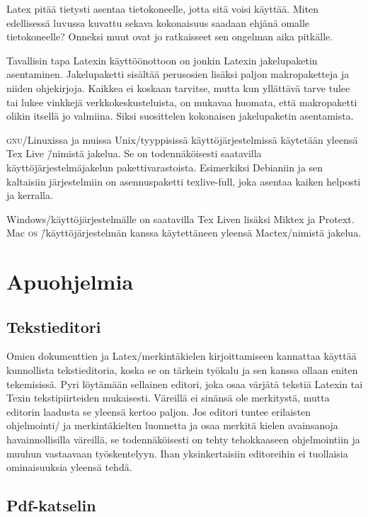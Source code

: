 Latex pitää tietysti asentaa tietokoneelle, jotta sitä voisi käyttää.
Miten edellisessä luvussa kuvattu sekava kokonaisuus saadaan ehjänä
omalle tietokoneelle? Onneksi muut ovat jo ratkaisseet sen ongelman aika
pitkälle.

Tavallisin tapa Latexin käyttöönottoon on jonkin Latexin jakelupaketin
asentaminen. Jakelupaketti sisältää perusosien lisäksi paljon
makropaketteja ja niiden ohjekirjoja. Kaikkea ei koskaan tarvitse, mutta
kun yllättävä tarve tulee tai lukee vinkkejä verkkokeskusteluista, on
mukavaa huomata, että makropaketti olikin itsellä jo valmiina. Siksi
suosittelen kokonaisen jakelupaketin asentamista.

\textsc{gnu}/Linuxissa ja muissa Unix\-/tyyppisissä käyttöjärjestelmissä
käytetään yleensä Tex Live \=/nimistä jakelua. Se on todennäköisesti
saatavilla käyttöjärjestelmäjakelun pakettivarastoista. Esimerkiksi
Debianiin ja sen kaltaisiin järjestelmiin on asennuspaketti
texlive-full, joka asentaa kaiken helposti ja kerralla.

Windows\-/käyttöjärjestelmälle on saatavilla Tex Liven lisäksi Miktex ja
Protext. Mac \textsc{os} \=/käyttöjärjestelmän kanssa käytettäneen
yleensä Mactex\-/nimistä jakelua.

\section{Apuohjelmia}

\subsection{Tekstieditori}

Omien dokumenttien ja Latex\-/merkintäkielen kirjoittamiseen kannattaa
käyttää kunnollista tekstieditoria, koska se on tärkein työkalu ja sen
kanssa ollaan eniten tekemisissä. Pyri löytämään sellainen editori, joka
osaa värjätä tekstiä Latexin tai Texin tekstipiirteiden mukaisesti.
Väreillä ei sinänsä ole merkitystä, mutta editorin laadusta se yleensä
kertoo paljon. Jos editori tuntee erilaisten ohjelmointi\-/{} ja
merkintäkielten luonnetta ja osaa merkitä kielen avainsanoja
havainnollisilla väreillä, se todennäköisesti on tehty tehokkaaseen
ohjelmointiin ja muuhun vastaavaan työskentelyyn. Ihan yksinkertaisiin
editoreihin ei tuollaisia ominaisuuksia yleensä tehdä.

\subsection{Pdf-katselin}

